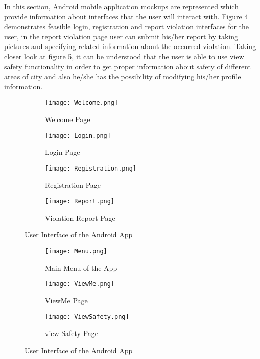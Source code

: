 In this section, Android mobile application mockups are represented which provide information about interfaces that the user will interact with. Figure 4 demonstrates feasible login, registration and report violation interfaces for the user, in the report violation page user can submit his/her report by taking pictures and specifying related information about the occurred violation. Taking closer look at figure 5, it can be understood that the user is able to use view safety functionality in order to get proper information about safety of different areas of city and also he/she has the possibility of modifying his/her profile information. 
\begin{figure}[H]
  \begin{subfigure}[b]{0.5\linewidth}
    \centering
    \texttt{[image: Welcome.png]} 
    \caption{Welcome Page} 
    \label{fig7:welcome} 
    \vspace{1ex}
  \end{subfigure}%
  \begin{subfigure}[b]{0.5\linewidth}
    \centering
    \texttt{[image: Login.png]} 
    \caption{Login Page} 
    \label{fig7:login} 
    \vspace{1ex}
  \end{subfigure} 
  \begin{subfigure}[b]{0.5\linewidth}
    \centering
    \texttt{[image: Registration.png]} 
    \caption{Registration Page} 
    \label{fig7:registration} 
  \end{subfigure}%
  \begin{subfigure}[b]{0.5\linewidth}
    \centering
    \texttt{[image: Report.png]} 
    \caption{Violation Report Page} 
    \label{fig7:report} 
  \end{subfigure} 
  \caption{User Interface of the Android App}
  \label{fig7} 
\end{figure}

\begin{figure}[H] 
  \begin{subfigure}[b]{0.5\linewidth}
    \centering
    \texttt{[image: Menu.png]} 
    \caption{Main Menu of the App} 
    \label{fig7:menu} 
    \vspace{4ex}
  \end{subfigure}%
  \begin{subfigure}[b]{0.5\linewidth}
    \centering
    \texttt{[image: ViewMe.png]} 
    \caption{ViewMe Page} 
    \label{fig7:viewme} 
    \vspace{4ex}
  \end{subfigure} 
  \begin{subfigure}[b]{0.5\linewidth}
    \centering
    \texttt{[image: ViewSafety.png]} 
    \caption{view Safety Page} 
    \label{fig7:viewsafety} 
  \end{subfigure}%
  \label{fig7} 
  \caption{User Interface of the Android App}
\end{figure}

